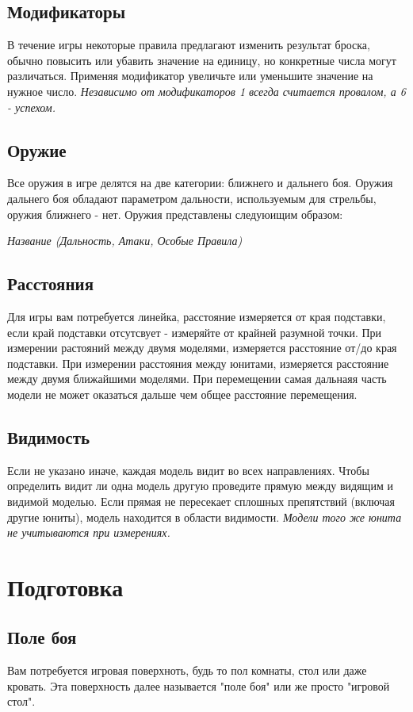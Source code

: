 \documentclass[twocolumn]{article}
\begin{document}
\subsection{Модификаторы}
В течение игры некоторые правила предлагают изменить результат броска, обычно повысить или убавить значение на единицу, но конкретные числа могут различаться. Применяя модификатор увеличьте или уменьшите значение на нужное число. \emph{Независимо от модификаторов 1 всегда считается провалом, а 6 - успехом.}

\subsection{Оружие}
Все оружия в игре делятся на две категории: ближнего и дальнего боя. Оружия дальнего боя обладают параметром дальности, используемым для стрельбы, оружия ближнего - нет. Оружия представлены следуюищим образом:
\begin{center}
    \textit{Название (Дальность, Атаки, Особые Правила)}
\end{center}

\subsection{Расстояния}
Для игры вам потребуется линейка, расстояние измеряется от края подставки, если край подставки отсутсвует - измеряйте от крайней разумной точки. При измерении растояний между двумя моделями, измеряется расстояние от/до края подставки. При измерении расстояния между юнитами, измеряется расстояние между двумя ближайшими моделями. При перемещении самая дальнаяя часть модели не может оказаться дальше чем общее расстояние перемещения.

\subsection{Видимость}
Если не указано иначе, каждая модель видит во всех направлениях. Чтобы определить видит ли одна модель другую проведите прямую между видящим и видимой моделью. Если прямая не пересекает сплошных препятствий (включая другие юниты), модель находится в области видимости. \emph{Модели того же юнита не учитываются при измерениях.}

\newpage

\section{Подготовка}
\subsection{Поле боя}
Вам потребуется игровая поверхноть, будь то пол комнаты, стол или даже кровать. Эта поверхность далее называется "поле боя" или же просто "игровой стол". 
\end{document}
